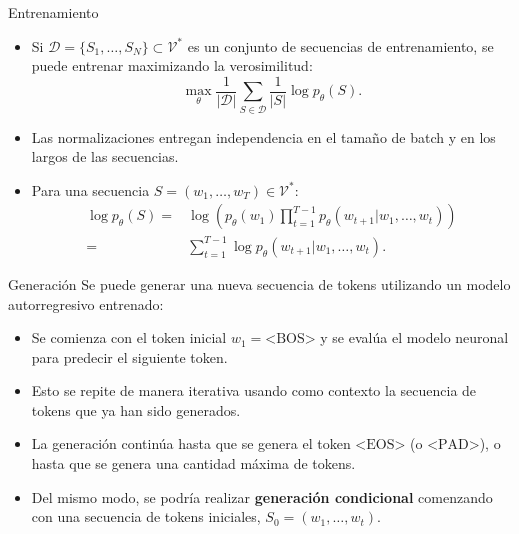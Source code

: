 \documentclass{beamer}
\begin{document}
\begin{frame}{Entrenamiento}
    \begin{itemize}
        \item  Si $\mathcal{D}=\{S_1,\ldots,S_N\}\subset\mathcal{V}^*$ es un conjunto de secuencias de entrenamiento, se puede entrenar maximizando la verosimilitud:
              \begin{equation*}
                  \max_\theta \frac{1}{|\mathcal{D}|}\sum_{S\in\mathcal{D}} \frac{1}{|S|}\log p_\theta(S).
              \end{equation*}
        \item Las normalizaciones entregan independencia en el tamaño de batch y en los largos de las secuencias.
        \item Para una secuencia $S=(w_1,\ldots,w_T)\in\mathcal{V}^*$:
              \begin{align*}
\log p_\theta(S)
=&\log\left(p_\theta(w_1)\prod_{t=1}^{T-1} p_\theta(w_{t+1}|w_1,\ldots,w_t)\right)\\
=& \sum_{t=1}^{T-1} \log p_\theta(w_{t+1}|w_1,\ldots,w_t).
\end{align*}
    \end{itemize}

\end{frame}

\begin{frame}{Generación}
    Se puede generar una nueva secuencia de tokens utilizando un modelo autorregresivo entrenado:
\begin{itemize}
    \item Se comienza con el token inicial $w_1=\text{<BOS>}$ y se evalúa el modelo neuronal para predecir el siguiente token.
    \item Esto se repite de manera iterativa usando como contexto la secuencia de tokens que ya han sido generados.
    \item La generación continúa hasta que se genera el token $\text{<EOS>}$ (o $\text{<PAD>}$), o hasta que se genera una cantidad máxima de tokens.
    \item Del mismo modo, se podría realizar \textbf{generación condicional} comenzando con una secuencia de tokens iniciales, $S_0=(w_1,\ldots,w_t)$.
\end{itemize}
\end{frame}
\end{document}
